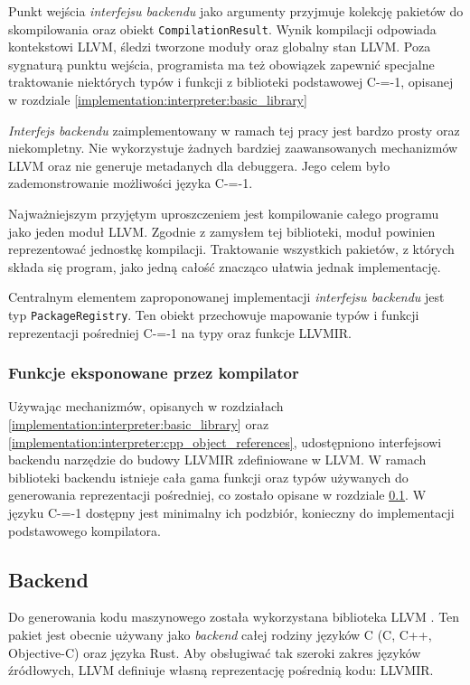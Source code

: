 Punkt wejścia \emph{interfejsu backendu} jako argumenty przyjmuje kolekcję pakietów do skompilowania oraz obiekt \lstinline{CompilationResult}.
Wynik kompilacji odpowiada kontekstowi LLVM, śledzi tworzone moduły oraz globalny stan LLVM.
Poza sygnaturą punktu wejścia, programista ma też obowiązek zapewnić specjalne traktowanie niektórych typów i funkcji z biblioteki podstawowej C-=-1, opisanej w rozdziale \ref{implementation:interpreter:basic_library}

\emph{Interfejs backendu} zaimplementowany w ramach tej pracy jest bardzo prosty oraz niekompletny.
Nie wykorzystuje żadnych bardziej zaawansowanych mechanizmów LLVM oraz nie generuje metadanych dla debuggera.
Jego celem było zademonstrowanie możliwości języka C-=-1.

Najważniejszym przyjętym uproszczeniem jest kompilowanie całego programu jako jeden moduł LLVM.
Zgodnie z zamysłem tej biblioteki, moduł powinien reprezentować jednostkę kompilacji.
Traktowanie wszystkich pakietów, z których składa się program, jako jedną całość znacząco ułatwia jednak implementację.

Centralnym elementem zaproponowanej implementacji \emph{interfejsu backendu} jest typ \lstinline{PackageRegistry}.
Ten obiekt przechowuje mapowanie typów i funkcji reprezentacji pośredniej C-=-1 na typy oraz funkcje LLVMIR.
\subsubsection{Funkcje eksponowane przez kompilator}

Używając mechanizmów, opisanych w rozdziałach \ref{implementation:interpreter:basic_library} oraz \ref{implementation:interpreter:cpp_object_references}, udostępniono interfejsowi backendu narzędzie do budowy LLVMIR zdefiniowane w LLVM.
W ramach biblioteki backendu istnieje cała gama funkcji oraz typów używanych do generowania reprezentacji pośredniej, co zostało opisane w rozdziale \ref{implementation:backend}.
W języku C-=-1 dostępny jest minimalny ich podzbiór, konieczny do implementacji podstawowego kompilatora.



\subsection{Backend}
\label{implementation:backend}
Do generowania kodu maszynowego została wykorzystana biblioteka LLVM \cite{Lattner:MSThesis02}.
Ten pakiet jest obecnie używany jako \emph{backend} całej rodziny języków C (C, C++, Objective-C) oraz języka Rust.
Aby obsługiwać tak szeroki zakres języków źródłowych, LLVM definiuje własną reprezentację pośrednią kodu: LLVMIR.

